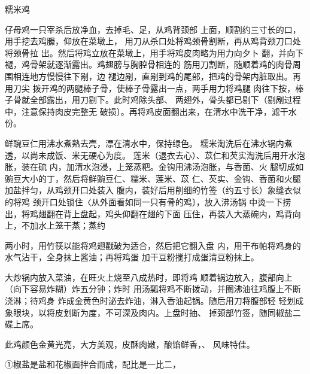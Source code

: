 \begin{recipe}[八宝糯米鸡]{糯米鸡}

\ingredients


\cooking

\step 	仔母鸡一只宰杀后放净血，去掉毛、足，从鸡背颈部 上面，顺割约三寸长的口，用手挖去鸡縢，仰放在菜墩上， 用刀从杀口处将鸡颈骨割断，再从鸡背颈刀口处将颈骨拉 出。然后将鸡立放在菜墩上，用手将鸡皮肉略为用力向夕卜 翻，并向下褪，鸡骨架就逐渐露出。鸡翅膀与胸腔骨相连的 筋用刀割断，随顺着鸡的肉骨周围相连地方慢慢往下剐，边 褪边剐，直剐到鸡的尾部，把鸡的骨架内脏取出。再用刀尖 拨开鸡的两腿棒子骨，使棒子骨露出一点，两手用力将鸡腿 肉往下按，棒子骨就全部露出，用刀剔下。此时鸡除头部、 两翅外，骨头都已剔下（剔剐过程中，注意保持肉皮完整无 破损〕。再将鸡皮面翻出来，在清水中洗干净，滤干水份。

\step 	鲜豌豆仁用沸水煮熟去壳，漂在清水中，保持绿色。 糯米淘洗后在沸水锅内煮透，以尚未成饭、米无硬心为度。 莲米（退衣去心）、苡仁和芡实淘洗后用开水泡胀，装在硫 内，加清水泡浸，上笼蒸粑。金钩用沸汤泡胀，与香菌、火 腿切成如豌豆大小的丁，然后将鲜豌豆仁、糯米、莲米、苡 仁、芡实、金钩、香菌和火腿加盐拌匀，从鸡颈开口处装入 腹内，装好后用削细的竹签（约五寸长）象缝衣似的将鸡 颈开口处锁住〈从外面看如同一只有骨的鸡〕，放入沸汤锅 中烫一下捞出，将鸡翅翻在背上盘起，鸡头仰翻在翅的下面 压住，再装入大蒸碗内，鸡背向上，不加水上笼干蒸；蒸约

两小时，用竹筷以能将鸡翅戳破为适合，然后把它翻入盘 内，用干布帕将鸡身的水气沾干，全身抹上酱油；再将鸡蛋 加干豆粉搅打成蛋清豆粉抹上。

\step 大炒锅内放入菜油，在旺火上烧至八成热时，即将鸡 顺着锅边放入，腹部向上（向下容易炸糊）炸五分钟；炸时 用汤瓢将鸡不断拨动，并圈沸油往鸡腹上不断浇淋；待鸡身 炸成金黄色时泌去炸油，淋入香油起锅。随后用刀将腹部轻 轻划成象眼块，以将皮划断为度，不可深及肉内。上盘时抽、 掉颈部竹签，随同椒盐二碟上席。

\notes

此鸡颜色金黄光亮，大方美观，皮酥肉嫩，酿馅鲜香，、 风味特佳。

①椒盐是盐和花椒面拌合而成，配比是一比二，

\end{recipe}


